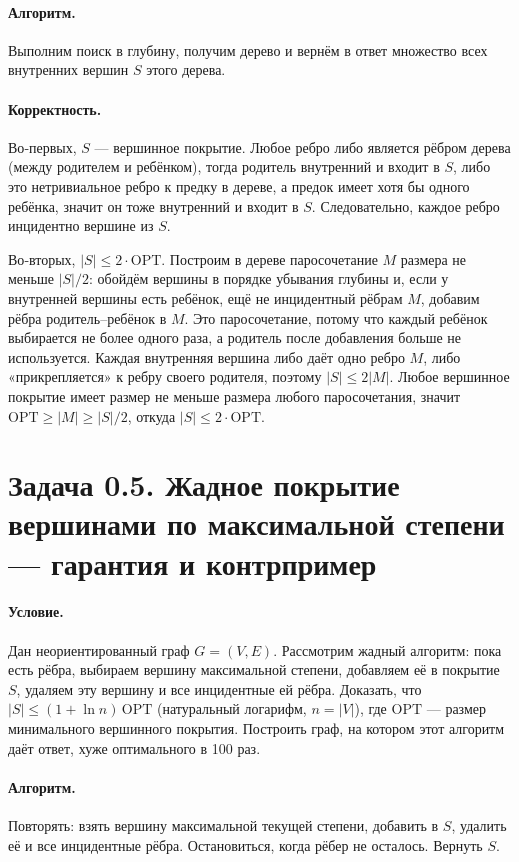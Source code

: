 \documentclass[12pt]{article}
\begin{document}
  \paragraph{Алгоритм.}
  Выполним поиск в глубину, получим дерево и вернём в ответ множество всех внутренних вершин $S$ этого дерева.

  \paragraph{Корректность.}
  Во‑первых, $S$ — вершинное покрытие. Любое ребро либо является рёбром дерева (между родителем и ребёнком), тогда родитель внутренний и входит в $S$, либо это нетривиальное ребро к предку в дереве, а предок имеет хотя бы одного ребёнка, значит он тоже внутренний и входит в $S$. Следовательно, каждое ребро инцидентно вершине из $S$.

  Во‑вторых, $|S|\le 2\cdot \mathrm{OPT}$. Построим в дереве паросочетание $M$ размера не меньше $|S|/2$: обойдём вершины в порядке убывания глубины и, если у внутренней вершины есть ребёнок, ещё не инцидентный рёбрам $M$, добавим рёбра родитель–ребёнок в $M$. Это паросочетание, потому что каждый ребёнок выбирается не более одного раза, а родитель после добавления больше не используется. Каждая внутренняя вершина либо даёт одно ребро $M$, либо «прикрепляется» к ребру своего родителя, поэтому $|S|\le 2|M|$. Любое вершинное покрытие имеет размер не меньше размера любого паросочетания, значит $\mathrm{OPT}\ge |M|\ge |S|/2$, откуда $|S|\le 2\cdot \mathrm{OPT}$.

  \section*{Задача 0.5. Жадное покрытие вершинами по максимальной степени — гарантия и контрпример}

  \paragraph{Условие.}
  Дан неориентированный граф $G=(V,E)$. Рассмотрим жадный алгоритм: пока есть рёбра, выбираем вершину максимальной степени, добавляем её в покрытие $S$, удаляем эту вершину и все инцидентные ей рёбра. Доказать, что $|S|\le (1+\ln n)\,\mathrm{OPT}$ (натуральный логарифм, $n=|V|$), где $\mathrm{OPT}$ — размер минимального вершинного покрытия. Построить граф, на котором этот алгоритм даёт ответ, хуже оптимального в 100 раз.

  \paragraph{Алгоритм.}
  Повторять: взять вершину максимальной текущей степени, добавить в $S$, удалить её и все инцидентные рёбра. Остановиться, когда рёбер не осталось. Вернуть $S$.
\end{document}
